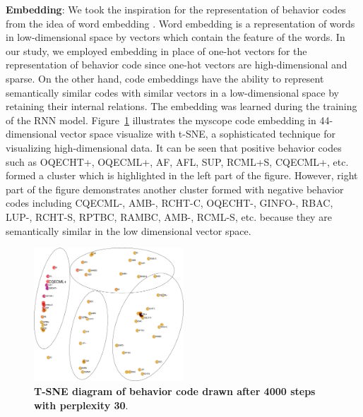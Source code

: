 \documentclass{amia_summit_2018}
\begin{document}
\textbf {Embedding}: We took the inspiration for the representation of behavior codes from the idea of word embedding \cite{bengio2003neural}. Word embedding is a representation of words in low-dimensional space by vectors which contain the feature of the words. In our study, we employed embedding in place of one-hot vectors for the representation of behavior code since one-hot vectors are high-dimensional and sparse. On the other hand, code embeddings have the ability to represent semantically similar codes with similar vectors in a low-dimensional space by retaining their internal relations. The embedding was learned during the training of the RNN model. Figure~\ref{fig:code_embedding} illustrates the myscope code embedding in 44-dimensional vector space visualize with t-SNE, a sophisticated technique for visualizing high-dimensional data. It can be seen that positive behavior codes such as OQECHT+, OQECML+, AF, AFL, SUP, RCML+S, CQECML+, etc. formed a cluster which is highlighted in the left part of the figure. However, right part of the figure demonstrates another cluster formed with negative behavior codes including CQECML-, AMB-, RCHT-C, OQECHT-, GINFO-, RBAC, LUP-, RCHT-S, RPTBC, RAMBC, AMB-, RCML-S, etc. because they are semantically similar in the low dimensional vector space. 
    
\begin{figure}[!htb]
    \centering
    \includegraphics[width=0.50\textwidth]{figures/word_embed_highlighted.eps}
    \caption{\textbf{T-SNE diagram of behavior code drawn after 4000 steps with perplexity 30}.}
    \label{fig:code_embedding}
\end{figure}
\end{document}
